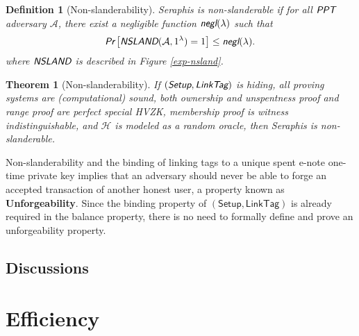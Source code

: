 \documentclass{article}
\newtheorem{definition}{Definition}[section]
\newtheorem{theorem}{Theorem}[section]
\begin{document}
\begin{definition}[Non-slanderability]
Seraphis is non-slanderable if for all $\emph{\textsf{PPT}}$ adversary $\mathcal{A}$, there exist a negligible function $\emph{\textsf{negl}}(\lambda)$ such that
\begin{align*}
\emph{\textsf{Pr}}
\left[
\emph{\textsf{NSLAND}}(\mathcal{A}, 1^{\lambda})=1
\right]
\le \emph{\textsf{negl}}(\lambda).
\end{align*}
where $\emph{\textsf{NSLAND}}$ is described in Figure \ref{exp-nsland}.
\end{definition}
\begin{theorem}[Non-slanderability]\label{thm-nsland}
If $(\emph{\textsf{Setup}},\emph{\textsf{LinkTag}})$ is hiding, all proving systems are (computational) sound, both ownership and unspentness proof and range proof are perfect special HVZK, membership proof is witness indistinguishable, and $\mathcal{H}$ is modeled as a random oracle, then Seraphis is non-slanderable.  
\end{theorem}
Non-slanderability and the binding of linking tags to a unique spent e-note one-time private key implies that an adversary should never be able to forge an accepted transaction of another honest user, a property known as \textbf{Unforgeability}. Since the binding property of $(\textsf{Setup},\textsf{LinkTag})$ is already required in the balance property, there is no need to formally define and prove an unforgeability property.

\subsection{Discussions}\label{sec-disc}

\section{Efficiency}




\appendix
\end{document}
